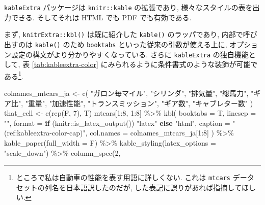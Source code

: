 \documentclass[
  xelatex,ja=standard,jafont=noto]{bxjsbook}
\newenvironment{Shaded}{\begin{snugshade}}{\end{snugshade}}
\newcommand{\AttributeTok}[1]{\textcolor[rgb]{0.77,0.63,0.00}{#1}}
\newcommand{\ControlFlowTok}[1]{\textcolor[rgb]{0.13,0.29,0.53}{\textbf{#1}}}
\newcommand{\DecValTok}[1]{\textcolor[rgb]{0.00,0.00,0.81}{#1}}
\newcommand{\FunctionTok}[1]{\textcolor[rgb]{0.00,0.00,0.00}{#1}}
\newcommand{\NormalTok}[1]{#1}
\newcommand{\OtherTok}[1]{\textcolor[rgb]{0.56,0.35,0.01}{#1}}
\newcommand{\SpecialCharTok}[1]{\textcolor[rgb]{0.00,0.00,0.00}{#1}}
\newcommand{\StringTok}[1]{\textcolor[rgb]{0.31,0.60,0.02}{#1}}
\theoremstyle{definition}
\theoremstyle{definition}
\theoremstyle{definition}
\theoremstyle{definition}
\theoremstyle{remark}
\begin{document}
\texttt{kableExtra} パッケージは \texttt{knitr::kable} の拡張であり,
様々なスタイルの表を出力できる. そしてそれは HTML でも PDF
でも有効である.

まず, \texttt{knitrExtra::kbl()} は既に紹介した \texttt{kable()}
のラッパであり, 内部で呼び出すのは \texttt{kable()} のため
\texttt{booktabs} といった従来の引数が使える上に,
オプション設定の構文がより分かりやすくなっている. さらに
\texttt{kableExtra} の独自機能として, 表 \ref{tab:kableextra-color}
にみられるように条件書式のような装飾が可能である\footnote{ところで私は自動車の性能を表す用語に詳しくない.
  これは \texttt{mtcars} データセットの列名を日本語訳したのだが,
  した表記に誤りがあれば指摘してほしい.}.




\begin{Shaded}
\begin{Highlighting}[numbers=left,,]
\NormalTok{colnames\_mtcars\_ja }\OtherTok{\textless{}{-}} \FunctionTok{c}\NormalTok{(}
  \StringTok{"ガロン毎マイル"}\NormalTok{, }\StringTok{"シリンダ"}\NormalTok{, }\StringTok{"排気量"}\NormalTok{, }\StringTok{"総馬力"}\NormalTok{,}
  \StringTok{"ギア比"}\NormalTok{, }\StringTok{"重量"}\NormalTok{, }\StringTok{"加速性能"}\NormalTok{, }\StringTok{"トランスミッション"}\NormalTok{, }\StringTok{"ギア数"}\NormalTok{, }\StringTok{"キャブレター数"}
\NormalTok{)}
\NormalTok{that\_cell }\OtherTok{\textless{}{-}} \FunctionTok{c}\NormalTok{(}\FunctionTok{rep}\NormalTok{(F, }\DecValTok{7}\NormalTok{), T)}
\NormalTok{mtcars[}\DecValTok{1}\SpecialCharTok{:}\DecValTok{8}\NormalTok{, }\DecValTok{1}\SpecialCharTok{:}\DecValTok{8}\NormalTok{] }\SpecialCharTok{\%\textgreater{}\%}
  \FunctionTok{kbl}\NormalTok{(}
    \AttributeTok{booktabs =}\NormalTok{ T, }\AttributeTok{linesep =} \StringTok{""}\NormalTok{,}
    \AttributeTok{format =} \ControlFlowTok{if}\NormalTok{ (knitr}\SpecialCharTok{::}\FunctionTok{is\_latex\_output}\NormalTok{()) }\StringTok{"latex"} \ControlFlowTok{else} \StringTok{"html"}\NormalTok{,}
    \AttributeTok{caption =} \StringTok{"(ref:kableextra{-}color{-}cap)"}\NormalTok{,}
    \AttributeTok{col.names =}\NormalTok{ colnames\_mtcars\_ja[}\DecValTok{1}\SpecialCharTok{:}\DecValTok{8}\NormalTok{]}
\NormalTok{  ) }\SpecialCharTok{\%\textgreater{}\%}
  \FunctionTok{kable\_paper}\NormalTok{(}\AttributeTok{full\_width =}\NormalTok{ F) }\SpecialCharTok{\%\textgreater{}\%}
  \FunctionTok{kable\_styling}\NormalTok{(}\AttributeTok{latex\_options =} \StringTok{"scale\_down"}\NormalTok{) }\SpecialCharTok{\%\textgreater{}\%}
  \FunctionTok{column\_spec}\NormalTok{(}\DecValTok{2}\NormalTok{,}

\end{Highlighting}
\end{Shaded}
\end{document}
